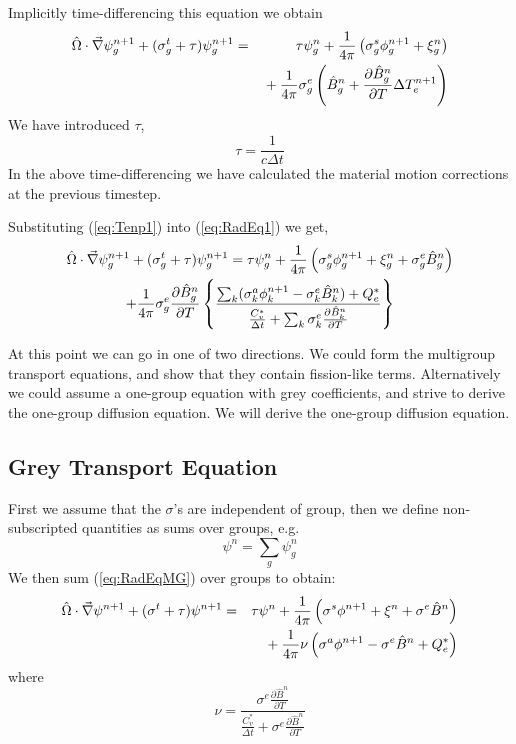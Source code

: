 \documentclass{article}
\newcommand{\dt}{\ensuremath{\Delta t}}
\newcommand{\Cvs}{\ensuremath{C_{v}^{*}}}
\newcommand{\Bn}{\ensuremath{\hat{B}^{n}}}
\newcommand{\pBndT}{\ensuremath{\frac{\partial\Bn}{\partial T}}}
\newcommand{\Bgn}{\ensuremath{\hat{B}_{g}^{n}}}
\newcommand{\pBgndT}{\ensuremath{\frac{\partial\Bgn}{\partial T}}}
\newcommand{\Bkn}{\ensuremath{\hat{B}_{k}^{n}}}
\newcommand{\pBkndT}{\ensuremath{\frac{\partial\Bkn}{\partial T}}}
\begin{document}
Implicitly time-differencing this equation we obtain
\begin{eqnarray}
\hat{\Omega} \cdot \del \psi^{n+1}_{g} + (\sigma^{t}_{g} + \tau) \psi^{n+1}_{g}
	&=&  \tau \psi_{g}^{n}
	 + \frac{1}{4\pi} \left( \sigma^{s}_{g} \phi^{n+1}_{g}
	+ \xi_{g}^{n} \right)
  \nonumber \\
    & & \mbox{}
	+ \frac{1}{4\pi} \sigma^{e}_{g} 
		\left(\Bgn + \pBgndT \Delta T_{e}^{n+1} \right)
\label{eq:RadEq1}
\end{eqnarray}
We have introduced $\tau$,
\begin{equation}
	\tau = \frac{1}{c\dt}
\end{equation}
In the above time-differencing
we have calculated the material motion corrections at the previous timestep.

Substituting (\ref{eq:Tenp1}) into (\ref{eq:RadEq1}) we get,
\begin{multline}
\hat{\Omega} \cdot \del \psi^{n+1}_{g} + (\sigma^{t}_{g} + \tau) \psi^{n+1}_{g}
	=
	 \tau \psi_{g}^{n}
	+ \frac{1}{4\pi} \left(
	 	\sigma^{s}_{g} \phi^{n+1}_{g}
		+ \xi_{g}^{n}
		+ \sigma^{e}_{g} \Bgn \right)
	\\
	+ \frac{1}{4\pi} \sigma^{e}_{g} \pBgndT
		\left\{ \frac{\sum_{k} (\sigma_{k}^{a}\phi_{k}^{n+1} 
					- \sigma_{k}^{e}\Bkn) + Q_{e}^{*}}
			     {\frac{\Cvs}{\dt} + \sum_{k} \sigma_{k}^{e}\pBkndT}
		\right\}
\label{eq:RadEqMG}
\end{multline}

At this point we can go in one of two directions.  We could form the
multigroup transport equations, and show that they contain fission-like terms.
Alternatively we could assume a one-group equation
with grey coefficients, and strive to derive the
one-group diffusion equation.  We will derive the one-group diffusion equation.

\subsection{Grey Transport Equation}

First we assume that the $\sigma$'s are independent of group, then
we define non-subscripted quantities as sums over groups, e.g.
\begin{equation}
	\psi^{n} = \sum_{g} \psi_{g}^{n}
\end{equation}
We then sum (\ref{eq:RadEqMG}) over groups to obtain:
\begin{eqnarray}
\hat{\Omega} \cdot \del \psi^{n+1} + (\sigma^{t} + \tau) \psi^{n+1}
	&=& \tau \psi^{n}
	+ \frac{1}{4\pi} \left( \sigma^{s} \phi^{n+1}
			+ \xi^{n}
			+ \sigma^{e} \Bn \right)
	\nonumber \\
	& & \mbox{}
	+ \frac{1}{4\pi} \nu \left( \sigma^{a}\phi^{n+1}
					- \sigma^{e}\Bn + Q_{e}^{*}\right)
\label{eq:RadEqGrey}
\end{eqnarray}
where
\begin{equation}
	\nu = \frac{\sigma^{e} \pBndT } {\frac{\Cvs}{\dt} + \sigma^{e}\pBndT}
\end{equation}
\end{document}
